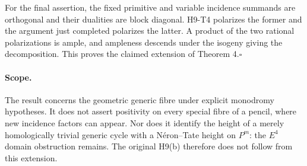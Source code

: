 For the final assertion, the fixed primitive and variable incidence
summands are orthogonal and their dualities are block diagonal.
H9-T4 polarizes the former and the argument just completed polarizes
the latter. A product of the two rational polarizations is ample,
and ampleness descends under the isogeny giving the decomposition.
This proves the claimed extension of Theorem 4.\hfill$\square$

\paragraph{Scope.}
The result concerns the geometric generic fibre under explicit monodromy
hypotheses. It does not assert positivity on every special fibre of a
pencil, where new incidence factors can appear. Nor does it identify
the height of a merely homologically trivial generic cycle with a
N\'eron--Tate height on $P^m$: the $E^4$ domain obstruction remains.
The original H9(b) therefore does not follow from this extension.
